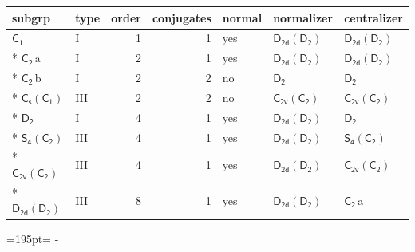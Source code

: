 \documentclass[10pt,a4paper]{article}
\newcommand{\needspace}[1]{\par\penalty-100\begingroup\dimen0=#1\relax\dimen2=\pagegoal
  \advance\dimen2-\pagetotal\ifdim\dimen0>\dimen2\relax\ifdim\dimen2>0pt\vfil\break\fi\fi
  \endgroup}
\numberwithin{equation}{section}
\newcommand{\grp}[1]{\mathsf{#1}}
\newcommand{\clsletter}[1]{\,{\scriptsize\color{black!55}#1}}
\begin{document}
{\small\begin{longtable}{@{}llrrlll@{}}\toprule
subgrp & type & order & conjugates & normal & normalizer & centralizer\\\midrule\endhead
\bottomrule\endfoot\endlastfoot
\href{../../../rotation/data/pdf/C1.pdf}{$\grp{C_{1}}$} & I & 1 & 1 & yes & \href{D2d-D2.pdf}{$\grp{D_{2d}}(\grp{D_{2}})$} & \href{D2d-D2.pdf}{$\grp{D_{2d}}(\grp{D_{2}})$}\\*
\href{../../../rotation/data/pdf/C2.pdf}{$\grp{C_{2}}$}\clsletter{a} & I & 2 & 1 & yes & \href{D2d-D2.pdf}{$\grp{D_{2d}}(\grp{D_{2}})$} & \href{D2d-D2.pdf}{$\grp{D_{2d}}(\grp{D_{2}})$}\\*
\href{../../../rotation/data/pdf/C2.pdf}{$\grp{C_{2}}$}\clsletter{b} & I & 2 & 2 & no & \href{../../../rotation/data/pdf/D2.pdf}{$\grp{D_{2}}$} & \href{../../../rotation/data/pdf/D2.pdf}{$\grp{D_{2}}$}\\*
\href{C1v-C1.pdf}{$\grp{C_{s}}(\grp{C_{1}})$} & III & 2 & 2 & no & \href{C2v-C2.pdf}{$\grp{C_{2v}}(\grp{C_{2}})$} & \href{C2v-C2.pdf}{$\grp{C_{2v}}(\grp{C_{2}})$}\\*
\href{../../../rotation/data/pdf/D2.pdf}{$\grp{D_{2}}$} & I & 4 & 1 & yes & \href{D2d-D2.pdf}{$\grp{D_{2d}}(\grp{D_{2}})$} & \href{../../../rotation/data/pdf/D2.pdf}{$\grp{D_{2}}$}\\*
\href{S4-C2.pdf}{$\grp{S_{4}}(\grp{C_{2}})$} & III & 4 & 1 & yes & \href{D2d-D2.pdf}{$\grp{D_{2d}}(\grp{D_{2}})$} & \href{S4-C2.pdf}{$\grp{S_{4}}(\grp{C_{2}})$}\\*
\href{C2v-C2.pdf}{$\grp{C_{2v}}(\grp{C_{2}})$} & III & 4 & 1 & yes & \href{D2d-D2.pdf}{$\grp{D_{2d}}(\grp{D_{2}})$} & \href{C2v-C2.pdf}{$\grp{C_{2v}}(\grp{C_{2}})$}\\*
\href{D2d-D2.pdf}{$\grp{D_{2d}}(\grp{D_{2}})$} & III & 8 & 1 & yes & \href{D2d-D2.pdf}{$\grp{D_{2d}}(\grp{D_{2}})$} & \href{../../../rotation/data/pdf/C2.pdf}{$\grp{C_{2}}$}\clsletter{a}\\
\bottomrule\end{longtable}}
\needspace{195pt}
\end{document}
